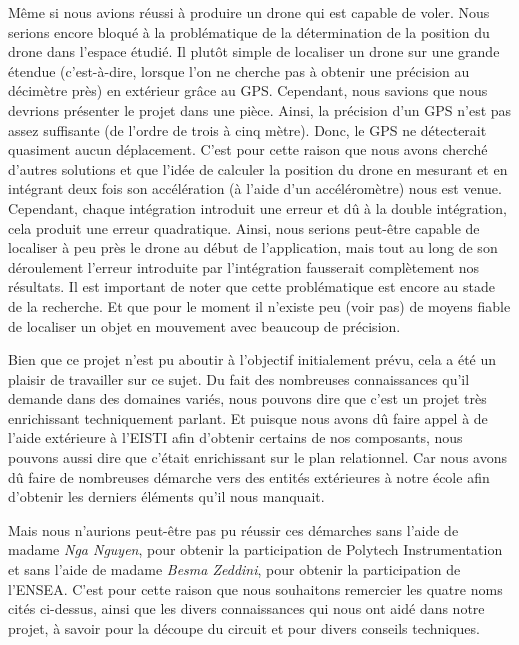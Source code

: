 \documentclass[a4paper,10pt]{report}
\begin{document}
    Même si nous avions réussi à produire un drone qui est capable de voler. 
Nous serions encore bloqué à la problématique de la détermination de la 
position du drone dans l'espace étudié. Il plutôt simple de localiser un drone 
sur une grande étendue (c'est-à-dire, lorsque l'on ne cherche pas à obtenir une 
précision au décimètre près) en extérieur grâce au GPS. Cependant, nous savions 
que nous devrions présenter le projet dans une pièce. Ainsi, la précision d'un 
GPS n'est pas assez suffisante (de l'ordre de trois à cinq mètre). Donc, le GPS 
ne détecterait quasiment aucun déplacement. C'est pour cette raison que nous 
avons cherché d'autres solutions et que l'idée de calculer la position du drone 
en mesurant et en intégrant deux fois son accélération (à l'aide d'un 
accéléromètre) nous est venue. Cependant, chaque intégration introduit une 
erreur et dû à la double intégration, cela produit une erreur quadratique. 
Ainsi, nous serions peut-être capable de localiser à peu près le drone au début 
de l'application, mais tout au long de son déroulement l'erreur introduite par 
l'intégration fausserait complètement nos résultats. Il est important de noter 
que cette problématique est encore au stade de la recherche. Et que pour le 
moment il n'existe peu (voir pas) de moyens fiable de localiser un objet en 
mouvement avec beaucoup de précision.

    Bien que ce projet n'est pu aboutir à l'objectif initialement prévu, cela a 
été un plaisir de travailler sur ce sujet. Du fait des nombreuses connaissances 
qu'il demande dans des domaines variés, nous pouvons dire que c'est un projet 
très enrichissant techniquement parlant. Et puisque nous avons dû faire appel à 
de l'aide extérieure à l'EISTI afin d'obtenir certains de nos composants, nous 
pouvons aussi dire que c'était enrichissant sur le plan relationnel. Car nous 
avons dû faire de nombreuses démarche vers des entités extérieures à notre 
école afin d'obtenir les derniers éléments qu'il nous manquait.

    Mais nous n'aurions peut-être pas pu réussir ces démarches sans l'aide de 
madame \textit{Nga Nguyen}, pour obtenir la participation de Polytech 
Instrumentation et sans l'aide de madame \textit{Besma Zeddini}, pour obtenir 
la participation de l'ENSEA. C'est pour cette raison que nous souhaitons 
remercier les quatre noms cités ci-dessus, ainsi que les divers connaissances 
qui nous ont aidé dans notre projet, à savoir pour la découpe du circuit et pour 
divers conseils techniques.
   
\end{document}
